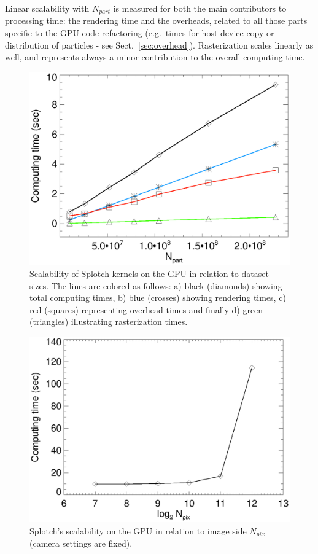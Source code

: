 \documentclass[preprint,5pt]{elsarticle}
\begin{document}
Linear scalability with $N_{part}$ is measured for both the main contributors to processing time: the rendering time and the overheads, related to all those parts specific to the GPU code refactoring (e.g.\ times for host-device copy or distribution of particles - see Sect.~\ref{sec:overhead}).
Rasterization scales linearly as well, and represents always a minor contribution to the overall computing time.   

\begin{figure}
\centering
\includegraphics[scale=0.5]{scala-fig3K20.eps}
\caption{Scalability of Splotch kernels on the GPU in relation to dataset sizes. 
The lines are colored as follows: a) black (diamonds) showing total computing times, b) blue (crosses) showing rendering times, c) red (squares) representing overhead times and finally d) green (triangles) illustrating rasterization times.}
\label{fig:scalability}
\end{figure}
 
\begin{figure}
\centering
\includegraphics[scale=0.5]{pixelsK20-fig4.eps}
\caption{Splotch's scalability on the GPU in relation to image side $N_{pix}$ (camera settings are fixed).}
\label{fig:pixels}
\end{figure}
\end{document}
